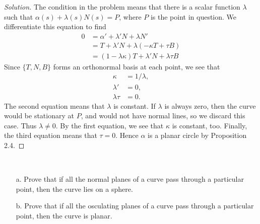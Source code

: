 \documentclass[Shifrin_Solutions_Spring_2015]{subfiles}
\begin{document}
\begin{proof}[Solution]
The condition in the problem means that there is a scalar function $\lambda$ such that $\alpha(s)  + \lambda(s)N(s) = P$, where $P$ is the point in question. We differentiate this equation to find
\[
\begin{split}
0 & = \alpha' + \lambda'N + \lambda N' \\
	& = T + \lambda' N + \lambda (-\kappa T +\tau B ) \\
	& = (1-\lambda\kappa) T + \lambda' N + \lambda\tau B
\end{split}
\]
Since $\{ T, N, B \}$ forms an orthonormal basis at each point, we see that
\begin{align*}
\kappa & = 1/\lambda , \\
\lambda' & = 0, \\
\lambda\tau & = 0 .
\end{align*}
The second equation means that $\lambda$ is constant. If $\lambda$ is always zero, then the curve would be stationary at $P$, and would not have normal lines, so we discard this case. Thus $\lambda \neq 0$. By the first equation, we see that $\kappa$ is constant, too. Finally, the third equation means that $\tau =0$. Hence $\alpha$ is a planar circle by Proposition 2.4.
\end{proof}

\vspace{.5cm}


\begin{exercise}$\ $ \\
\begin{itemize}
\item[a.] Prove that if all the normal planes of a curve pass through a particular point, then the curve lies on a sphere.
\item[b.] Prove that if all the osculating planes of a curve pass through a particular point, then the curve is planar.
\end{itemize}
\end{exercise}
\end{document}
